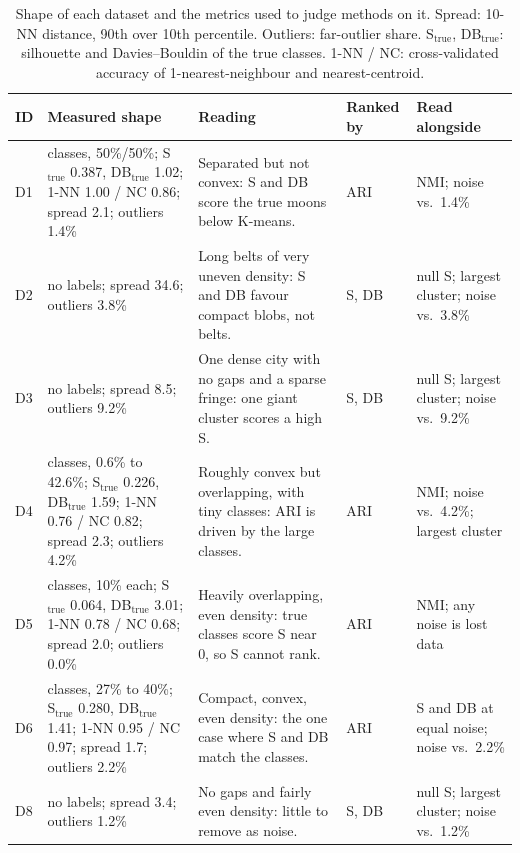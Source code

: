 \begin{table}[h]\centering\footnotesize
\caption{Shape of each dataset and the metrics used to judge methods on it. Spread: 10-NN distance, 90th
over 10th percentile. Outliers: far-outlier share. S$_\text{true}$, DB$_\text{true}$: silhouette and
Davies--Bouldin of the true classes. 1-NN / NC: cross-validated accuracy of 1-nearest-neighbour and
nearest-centroid.}
\label{tab:metric_choice}
\begin{tabularx}{\textwidth}{@{}l>{\raggedright\arraybackslash}p{4.6cm}>{\raggedright\arraybackslash}Xl>{\raggedright\arraybackslash}p{3.4cm}@{}}
\toprule
\textbf{ID} & \textbf{Measured shape} & \textbf{Reading} & \textbf{Ranked by} & \textbf{Read alongside} \\
\midrule
D1 & 2 classes, 50\%/50\%; S$_\text{true}$ 0.387, DB$_\text{true}$ 1.02; 1-NN 1.00 / NC 0.86; spread 2.1;
outliers 1.4\% & Separated but not convex: S and DB score the true moons below K-means. & ARI & NMI; noise vs.\ 1.4\% \\
D2 & no labels; spread 34.6; outliers 3.8\% & Long belts of very uneven density: S and DB favour compact
blobs, not belts. & S, DB & null S; largest cluster; noise vs.\ 3.8\% \\
D3 & no labels; spread 8.5; outliers 9.2\% & One dense city with no gaps and a sparse fringe: one giant
cluster scores a high S. & S, DB & null S; largest cluster; noise vs.\ 9.2\% \\
D4 & 8 classes, 0.6\% to 42.6\%; S$_\text{true}$ 0.226, DB$_\text{true}$ 1.59; 1-NN 0.76 / NC 0.82; spread
2.3; outliers 4.2\% & Roughly convex but overlapping, with tiny classes: ARI is driven by the large classes. &
ARI & NMI; noise vs.\ 4.2\%; largest cluster \\
D5 & 10 classes, 10\% each; S$_\text{true}$ 0.064, DB$_\text{true}$ 3.01; 1-NN 0.78 / NC 0.68; spread 2.0;
outliers 0.0\% & Heavily overlapping, even density: true classes score S near 0, so S cannot rank. & ARI &
NMI; any noise is lost data \\
D6 & 3 classes, 27\% to 40\%; S$_\text{true}$ 0.280, DB$_\text{true}$ 1.41; 1-NN 0.95 / NC 0.97; spread 1.7;
outliers 2.2\% & Compact, convex, even density: the one case where S and DB match the classes. & ARI &
S and DB at equal noise; noise vs.\ 2.2\% \\
D8 & no labels; spread 3.4; outliers 1.2\% & No gaps and fairly even density: little to remove as noise. & S,
DB & null S; largest cluster; noise vs.\ 1.2\% \\
\bottomrule
\end{tabularx}
\end{table}

